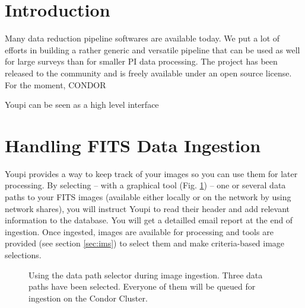 \documentclass[11pt,twoside]{article}  %
\begin{document}

\section{Introduction}

Many data reduction pipeline softwares are available today. We put a lot 
of efforts in building a rather generic and versatile pipeline that can be used 
as well for large surveys than for smaller PI data processing. The project has 
been released to the community and is freely available under an open source 
license. 
For the moment, 
CONDOR

Youpi can be seen as a high level interface


\section{Handling FITS Data Ingestion}

Youpi provides a way to keep track of your images so you can use them for later 
processing. By selecting -- with a graphical tool (Fig. \ref{fig:pathsel}) -- 
one or several data paths to your FITS images (available either locally or on the 
network by using network shares), you will instruct Youpi to read their header and 
add relevant information to the database. You will get a detailled email report at 
the end of ingestion. Once ingested, images are available for processing and tools 
are provided (see section \ref{sec:ims}) to select them and make criteria-based 
image selections.

\begin{figure}[t]
\caption{Using the data path selector during image ingestion. Three data paths have 
been selected. Everyone of them will be queued for ingestion on the Condor Cluster.}\label{fig:pathsel}
\end{figure}
\end{document}
